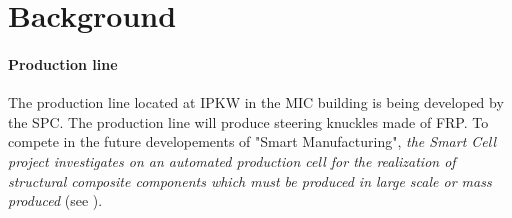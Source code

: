 \section{Background}

 

\paragraph{Production line}

The production line located at \ac{IPKW} in the \ac{MIC} building is being developed by the \ac{SPC}. The production line will produce steering knuckles made of \ac{FRP}. To compete in the future developements of "Smart Manufacturing", \textit{the Smart Cell  project investigates on an automated production cell for the realization of structural composite components which must be produced in large scale or mass produced} (see \cite{SPCWebsite}). %





